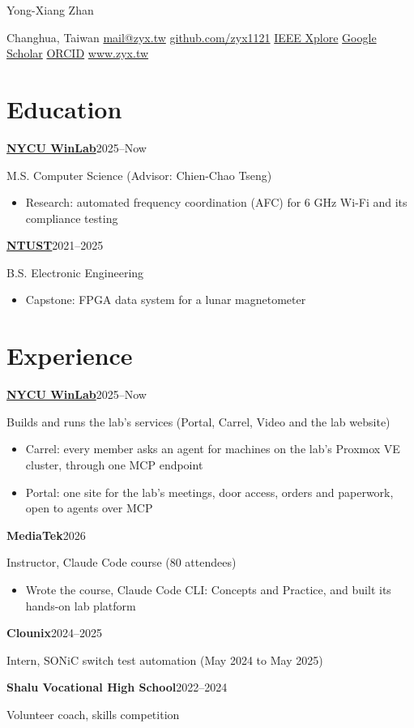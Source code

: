 \documentclass[10pt,a4paper]{article}
\newcommand{\row}[3]{\textbf{#1}\hfill #3\par #2\par}
\begin{document}
{\LARGE Yong-Xiang Zhan}\par\vspace{3pt}
Changhua, Taiwan\quad
\href{mailto:mail@zyx.tw}{mail@zyx.tw}\quad
\href{https://github.com/zyx1121}{github.com/zyx1121}\quad
\href{https://ieeexplore.ieee.org/author/640961431173820}{IEEE Xplore}\quad
\href{https://scholar.google.com/citations?user=SNFwXa4AAAAJ}{Google Scholar}\quad
\href{https://orcid.org/0009-0007-7012-9888}{ORCID}\quad
\href{https://www.zyx.tw}{www.zyx.tw}

\section{Education}
\row{\href{https://www.winlab.tw}{NYCU WinLab}}{M.S. Computer Science (Advisor: Chien-Chao Tseng)}{2025--Now}
\begin{itemize}[label={\textbullet},leftmargin=12pt,itemsep=1pt]
\item Research: automated frequency coordination (AFC) for 6 GHz Wi-Fi and its compliance testing
\end{itemize}
\vspace{3pt}
\row{\href{https://www.ntust.edu.tw}{NTUST}}{B.S. Electronic Engineering}{2021--2025}
\begin{itemize}[label={\textbullet},leftmargin=12pt,itemsep=1pt]
\item Capstone: FPGA data system for a lunar magnetometer
\end{itemize}
\vspace{3pt}

\section{Experience}
\row{\href{https://www.winlab.tw}{NYCU WinLab}}{Builds and runs the lab's services (Portal, Carrel, Video and the lab website)}{2025--Now}
\begin{itemize}[label={\textbullet},leftmargin=12pt,itemsep=1pt]
\item Carrel: every member asks an agent for machines on the lab's Proxmox VE cluster, through one MCP endpoint
\item Portal: one site for the lab's meetings, door access, orders and paperwork, open to agents over MCP
\end{itemize}
\vspace{3pt}
\row{MediaTek}{Instructor, Claude Code course (80 attendees)}{2026}
\begin{itemize}[label={\textbullet},leftmargin=12pt,itemsep=1pt]
\item Wrote the course, Claude Code CLI: Concepts and Practice, and built its hands-on lab platform
\end{itemize}
\vspace{3pt}
\row{Clounix}{Intern, SONiC switch test automation (May 2024 to May 2025)}{2024--2025}
\vspace{3pt}
\row{Shalu Vocational High School}{Volunteer coach, skills competition}{2022--2024}
\vspace{3pt}
\end{document}
